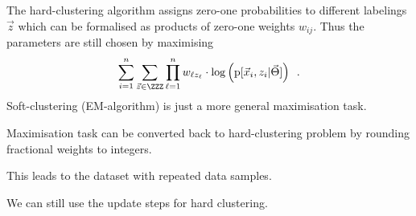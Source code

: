 \documentclass[landscape,footrule]{foils}
\newcommand{\pd}[1]{\mathrm{p}[#1]}
\begin{document}
The hard-clustering algorithm assigns zero-one probabilities to different labelings $\vec{z}$ which can be formalised as products of zero-one weights $w_{ij}$. Thus the parameters are still chosen by maximising
\begin{align*}
\sum_{i=1}^n \sum_{\vec{z}\in\ZZZ}\prod_{\ell=1}^n w_{\ell z_\ell}\cdot\log\left(\pd{\vec{x}_i,z_i|\vec{\Theta}}\right)
\enspace.
\end{align*}
Soft-clustering (EM-algorithm) is just a more general maximisation task.

Maximisation task can be converted back to hard-clustering problem by rounding fractional weights to integers.
\begin{triangles}
\item This leads to the dataset with repeated data samples. 
\item We can still use the update steps for hard clustering.
\end{triangles}
\end{document}
